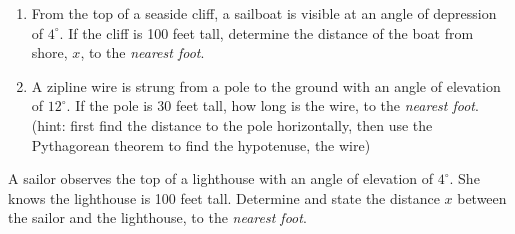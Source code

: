 \begin{enumerate}
\newpage
\item From the top of a seaside cliff, a sailboat is visible at an angle of depression of $4^\circ$. If the cliff is 100 feet tall, determine the distance of the boat from shore, $x$, to the \emph{nearest foot}.
\begin{center}
  \end{center} \vspace{3.25cm}

\item A zipline wire is strung from a pole to the ground with an angle of elevation of $12^\circ$. If the pole is 30 feet tall, how long is the wire, to the \emph{nearest foot}. \\[0.25cm]
(hint: first find the distance to the pole horizontally, then use the Pythagorean theorem to find the hypotenuse, the wire)\\[0.25cm]
   \vspace{4cm}

\end{enumerate}


\item A sailor observes the top of a lighthouse with an angle of elevation of $4^\circ$. She knows the lighthouse is 100 feet tall. Determine and state the distance $x$ between the sailor and the lighthouse, to the \emph{nearest foot}.\\[0.25cm]
     \vspace{3.25cm}

